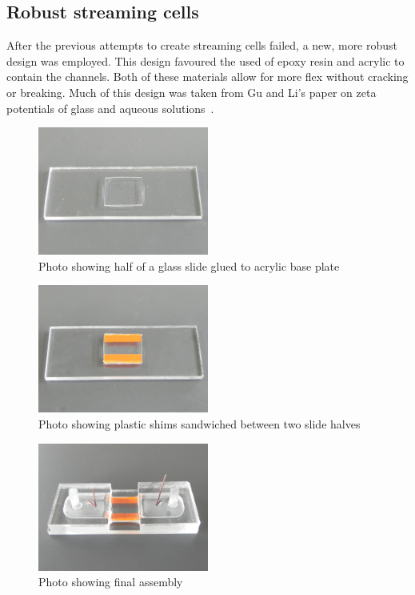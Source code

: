 \subsection{Robust streaming cells}

    After the previous attempts to create streaming cells failed, a new, more robust design was employed.
    This design favoured the used of epoxy resin and acrylic to contain the channels.
    Both of these materials allow for more flex without cracking or breaking.
    Much of this design was taken from Gu and Li's paper on zeta potentials of glass and aqueous solutions~\cite{Gu2000}.

    \begin{figure}[p]
      \centering
      \includegraphics[width=0.5\textwidth]{content/pt1/01-PowerHarvesting/graphics/Photo_streamingPotential_Assembly_Step1.JPG}
      \caption{\label{fig:Photo_streamingPotential_Assembly_Step1}Photo showing half of a glass slide glued to acrylic base plate}
    \end{figure}
    \begin{figure}[p]
      \centering
      \includegraphics[width=0.5\textwidth]{content/pt1/01-PowerHarvesting/graphics/Photo_streamingPotential_Assembly_Step2.JPG}
      \caption{\label{fig:Photo_streamingPotential_Assembly_Step2}Photo showing plastic shims sandwiched between two slide halves}
    \end{figure}
    \begin{figure}[p]
      \centering
      \includegraphics[width=0.5\textwidth]{content/pt1/01-PowerHarvesting/graphics/Photo_streamingPotential_Assembly_Step3.JPG}
      \caption{\label{fig:Photo_streamingPotential_Assembly_Step3}Photo showing final assembly}
    \end{figure}

